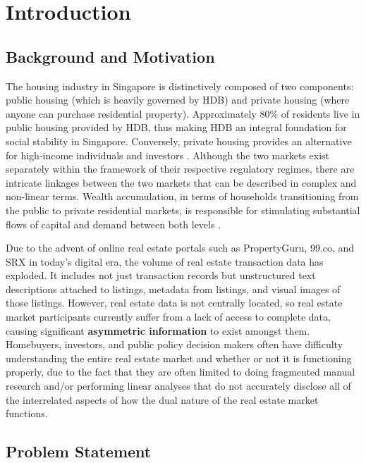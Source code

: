 \chapter{Introduction}

\section{Background and Motivation}

The housing industry in Singapore is distinctively composed of two components: public housing (which is heavily governed by HDB) and private housing (where anyone can purchase residential property). Approximately 80\% of residents live in public housing provided by HDB, thus making HDB an integral foundation for social stability in Singapore. Conversely, private housing provides an alternative for high-income individuals and investors \cite{tu2004dynamics}. Although the two markets exist separately within the framework of their respective regulatory regimes, there are intricate linkages between the two markets that can be described in complex and non-linear terms. Wealth accumulation, in terms of households transitioning from the public to private residential markets, is responsible for stimulating substantial flows of capital and demand between both levels \cite{sing2006price}.

Due to the advent of online real estate portals such as PropertyGuru, 99.co, and SRX in today's digital era, the volume of real estate transaction data has exploded. It includes not just transaction records but unstructured text descriptions attached to listings, metadata from listings, and visual images of those listings. However, real estate data is not centrally located, so real estate market participants currently suffer from a lack of access to complete data, causing significant \textbf{asymmetric information} to exist amongst them. Homebuyers, investors, and public policy decision makers often have difficulty understanding the entire real estate market and whether or not it is functioning properly, due to the fact that they are often limited to doing fragmented manual research and/or performing linear analyses that do not accurately disclose all of the interrelated aspects of how the dual nature of the real estate market functions.

\section{Problem Statement}


